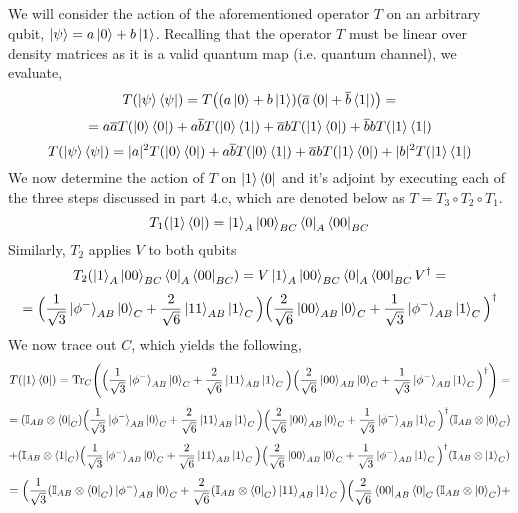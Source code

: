 \documentclass[12pt]{article}
\begin{document}
\begin{enumerate}
\subsection{}
We will consider the action of the aforementioned operator $T$ on an arbitrary qubit, $\ket{\psi} = a \ket{0} + b\ket{1}$. Recalling that the operator $T$ must be linear over density matrices as it is a valid quantum map (i.e. quantum channel), we evaluate,
$$ T(\ket{\psi} \bra{\psi}) = T\big( (a\ket{0} + b\ket{1}) (\overline{a} \bra{0} + \overline{b} \bra{1}) \big) = $$ 
$$ = a\overline{a} T(\ket{0} \bra{0}) + a \overline{b} T(\ket{0} \bra{1}) + \overline{a} b T(\ket{1} \bra{0}) + \overline{b} b T(\ket{1} \bra{1}) $$
$$ T(\ket{\psi} \bra{\psi}) = |a|^2 T(\ket{0} \bra{0}) + a \overline{b} T(\ket{0} \bra{1}) + \overline{a} b T(\ket{1} \bra{0}) + |b|^2 T(\ket{1} \bra{1}) $$
We now determine the action of $T$ on $\ket{1} \bra{0}$ and it's adjoint by executing each of the three steps discussed in part 4.c, which are denoted below as $T = T_3\circ T_2 \circ T_1$.
$$ T_1(\ket{1} \bra{0}) = \ket{1}_A \ket{00}_{BC} \bra{0}_A \bra{00}_{BC} $$
Similarly, $T_2$ applies $V$ to both qubits
$$ T_2(\ket{1}_A \ket{00}_{BC} \bra{0}_A \bra{00}_{BC}) = V\ket{1}_A \ket{00}_{BC} \bra{0}_A \bra{00}_{BC} V^\dagger = $$
$$ = \Big(\frac{1}{\sqrt{3}}\ket{\phi^-}_{AB} \ket{0}_C + \frac{2}{\sqrt{6}} \ket{11}_{AB}\ket{1}_C
\Big)\Big( \frac{2}{\sqrt{6}} \ket{00}_{AB}\ket{0}_C +
\frac{1}{\sqrt{3}}\ket{\phi^-}_{AB} \ket{1}_C \Big)^\dagger
 $$
We now trace out $C$, which yields the following,
$$T(\ket{1} \bra{0}) = \mathrm{Tr}_C \Bigg( \Big(\frac{1}{\sqrt{3}}\ket{\phi^-}_{AB} \ket{0}_C + \frac{2}{\sqrt{6}} \ket{11}_{AB}\ket{1}_C
\Big)\Big( \frac{2}{\sqrt{6}} \ket{00}_{AB}\ket{0}_C +
\frac{1}{\sqrt{3}}\ket{\phi^-}_{AB} \ket{1}_C \Big)^\dagger \Bigg) = $$
$$ = (\mathbb{I}_{AB}\otimes\bra{0}_C) \Big(\frac{1}{\sqrt{3}}\ket{\phi^-}_{AB} \ket{0}_C + \frac{2}{\sqrt{6}} \ket{11}_{AB}\ket{1}_C
\Big)\Big( \frac{2}{\sqrt{6}} \ket{00}_{AB}\ket{0}_C +
\frac{1}{\sqrt{3}}\ket{\phi^-}_{AB} \ket{1}_C \Big)^\dagger  (\mathbb{I}_{AB}\otimes\ket{0}_C)$$
$$ + (\mathbb{I}_{AB}\otimes\bra{1}_C) \Big(\frac{1}{\sqrt{3}}\ket{\phi^-}_{AB} \ket{0}_C + \frac{2}{\sqrt{6}} \ket{11}_{AB}\ket{1}_C
\Big)\Big( \frac{2}{\sqrt{6}} \ket{00}_{AB}\ket{0}_C +
\frac{1}{\sqrt{3}}\ket{\phi^-}_{AB} \ket{1}_C \Big)^\dagger  (\mathbb{I}_{AB}\otimes\ket{1}_C) $$
$$ = \Big(\frac{1}{\sqrt{3}}(\mathbb{I}_{AB}\otimes\bra{0}_C) \ket{\phi^-}_{AB} \ket{0}_C + \frac{2}{\sqrt{6}} (\mathbb{I}_{AB}\otimes\bra{0}_C) \ket{11}_{AB}\ket{1}_C
\Big) \Big( \frac{2}{\sqrt{6}} \bra{00}_{AB}\bra{0}_C (\mathbb{I}_{AB}\otimes\ket{0}_C) +
$$
\end{enumerate}
\end{document}
